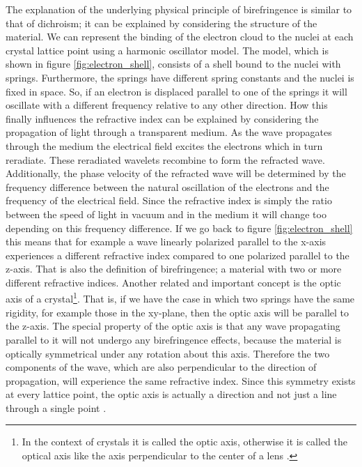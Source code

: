 The explanation of the underlying physical principle of birefringence is similar to that of dichroism; it can be explained by considering the structure of the material. We can represent the binding of the electron cloud to the nuclei at each crystal lattice point using a harmonic oscillator model. The model, which is shown in figure \ref{fig:electron_shell}, consists of a shell bound to the nuclei with springs. Furthermore, the springs have different spring constants and the nuclei is fixed in space. So, if an electron is displaced parallel to one of the springs it will oscillate with a different frequency relative to any other direction. How this finally influences the refractive index can be explained by considering the propagation of light through a transparent medium. As the wave propagates through the medium the electrical field excites the electrons which in turn reradiate. These reradiated wavelets recombine to form the refracted wave. Additionally, the phase velocity of the refracted wave will be determined by the frequency difference between the natural oscillation of the electrons and the frequency of the electrical field. Since the refractive index is simply the ratio between the speed of light in vacuum and in the medium it will change too depending on this frequency difference. If we go back to figure \ref{fig:electron_shell} this means that for example a wave linearly polarized parallel to the x-axis experiences a different refractive index compared to one polarized parallel to the z-axis. That is also the definition of birefringence; a material with two or more different refractive indices. Another related and important concept is the optic axis of a crystal\footnote{In the context of crystals it is called the optic axis, otherwise it is called the optical axis like the axis perpendicular to the center of a lens \cite{HechtOpticsEdition}.}. That is, if we have the case in which two springs have the same rigidity, for example those in the xy-plane, then the optic axis will be parallel to the z-axis. The special property of the optic axis is that any wave propagating parallel to it will not undergo any birefringence effects, because the material is optically symmetrical under any rotation about this axis. Therefore the two components of the wave, which are also perpendicular to the direction of propagation, will experience the same refractive index. Since this symmetry exists at every lattice point, the optic axis is actually a direction and not just a line through a single point \cite{HechtOpticsEdition}. 

